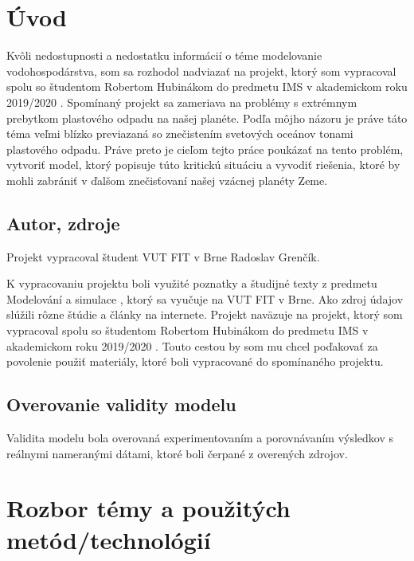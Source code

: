 \documentclass[a4paper, 11pt]{article}
\begin{document}
\section{Úvod}

Kvôli nedostupnosti a nedostatku informácií o téme modelovanie vodohospodárstva, som sa rozhodol nadviazať na projekt, ktorý som vypracoval spolu so študentom Robertom Hubinákom do predmetu IMS v akademickom roku 2019/2020 \cite{IMS_project}. Spomínaný projekt sa zameriava na problémy s extrémnym prebytkom plastového odpadu na našej planéte. Podľa môjho názoru je práve táto téma veľmi blízko previazaná so znečistením svetových oceánov tonami plastového odpadu. Práve preto je cieľom tejto práce poukázať na tento problém, vytvoriť model, ktorý popisuje túto kritickú situáciu a vyvodiť riešenia, ktoré by mohli zabrániť v ďalšom znečisťovaní našej vzácnej planéty Zeme.

\subsection{Autor, zdroje}

Projekt vypracoval študent VUT FIT v Brne Radoslav Grenčík.

K vypracovaniu projektu boli využité poznatky a študijné texty z predmetu Modelování a simulace \cite{IMS_slides}, ktorý sa vyučuje na VUT FIT v Brne. Ako zdroj údajov slúžili rôzne štúdie a články na internete. Projekt naväzuje na projekt, ktorý som vypracoval spolu so študentom Robertom Hubinákom do predmetu IMS v akademickom roku 2019/2020 \cite{IMS_project}. Touto cestou by som mu chcel poďakovať za povolenie použiť materiály, ktoré boli vypracované do spomínaného projektu.

\subsection{Overovanie validity modelu}

Validita modelu bola overovaná experimentovaním a porovnávaním výsledkov s reálnymi nameranými dátami, ktoré boli čerpané z overených zdrojov.

\pagebreak
\section{Rozbor témy a použitých metód/technológií}
\end{document}

